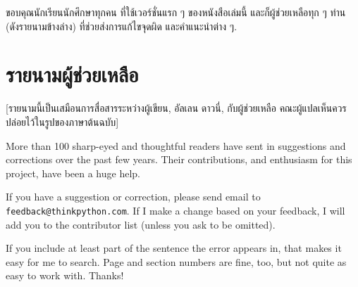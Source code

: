 ขอบคุณนักเรียนนักศึกษาทุกคน ที่ใช้เวอร์ชั่นแรก ๆ ของหนังสือเล่มนี้
และก็ผู้ช่วยเหลือทุก ๆ ท่าน (ดังรายนามข้างล่าง)
ที่ช่วยส่งการแก้ไขจุดผิด และคำแนะนำต่าง ๆ.

\section*{รายนามผู้ช่วยเหลือ}


[รายนามนี้เป็นเสมือนการสื่อสารระหว่างผู้เขียน, อัลเลน ดาวนี่, กับผู้ช่วยเหลือ
คณะผู้แปลเห็นควรปล่อยไว้ในรูปของภาษาต้นฉบับ]

More than 100 sharp-eyed and thoughtful readers have sent in
suggestions and corrections over the past few years.  Their
contributions, and enthusiasm for this project, have been a
huge help.

If you have a suggestion or correction, please send email to 
\texttt{feedback@thinkpython.com}.  If I make a change based on your
feedback, I will add you to the contributor list
(unless you ask to be omitted).

If you include at least part of the sentence the
error appears in, that makes it easy for me to search.  Page and
section numbers are fine, too, but not quite as easy to work with.
Thanks!

